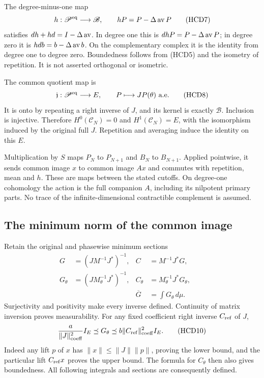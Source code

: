 The degree-minus-one map
\[
 h:\mathscr P^{\rm eq}\longrightarrow\mathscr B,\qquad
 hP=P-\Delta\operatorname{av} P
 \tag{HCD7}
\]
satisfies $dh+hd=I-\Delta\operatorname{av}$. In degree one this is
$dhP=P-\Delta\operatorname{av} P$; in degree zero it is
$hd b=b-\Delta\operatorname{av} b$. On the complementary complex it
is the identity from degree one to degree zero. Boundedness
follows from (HCD5) and the isometry of repetition.
It is not asserted orthogonal or isometric.

The common quotient map is
\[
 \mathfrak j:\mathscr P^{\rm eq}\longrightarrow E,\qquad
 P\longmapsto JP(\theta)\text{ a.e.}
 \tag{HCD8}
\]
It is onto by repeating a right inverse of $J$, and its
kernel is exactly $\mathscr B$. Inclusion is injective.
Therefore $H^0(\mathscr C_N)=0$ and $H^1(\mathscr C_N)=E$,
with the isomorphism induced by the original full $J$.
Repetition and averaging induce the identity on this $E$.

Multiplication by $S$ maps $P_N$ to $P_{N+1}$ and $B_N$
to $B_{N+1}$. Applied pointwise, it sends common image $x$
to common image $Ax$ and commutes with repetition, mean
and $h$. These are maps between the stated cutoffs.
On degree-one cohomology the action is the full companion
$A$, including its nilpotent primary parts. No trace of
the infinite-dimensional contractible complement is assumed.

\subsection{The minimum norm of the common image}

Retain the original and phasewise minimum sections
\[
 \begin{aligned}
 G&=(JM^{-1}J^*)^{-1},& C&=M^{-1}J^*G,\\
 G_\theta&=(JM_\theta^{-1}J^*)^{-1},&
 C_\theta&=M_\theta^{-1}J^*G_\theta,\qquad\\
 &&\overline G&=\int G_\theta\,d\mu.
 \end{aligned}
 \tag{HCD9}
\]
Surjectivity and positivity make every inverse defined.
Continuity of matrix inversion proves measurability.
For any fixed coefficient right inverse $C_{\rm ref}$ of $J$,
\[
 \frac{a}{\|J\|_{\rm coeff}^2}I_E
 \preceq G_\theta
 \preceq b\|C_{\rm ref}\|_{\rm coeff}^2I_E.
 \tag{HCD10}
\]
Indeed any lift $p$ of $x$ has
$\|x\|\le\|J\|\|p\|$, proving the lower bound, and the
particular lift $C_{\rm ref}x$ proves the upper bound.
The formula for $C_\theta$ then also gives boundedness.
All following integrals and sections are consequently defined.

